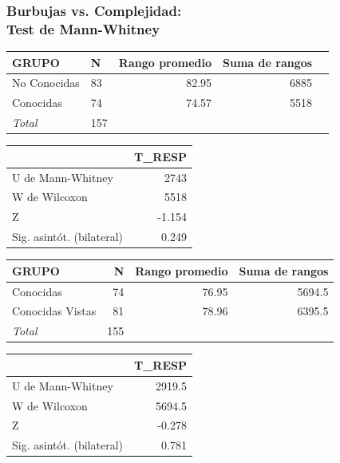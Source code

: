 \documentclass[10pt]{beamer}
\begin{document}
      \begin{frame}
      \tiny
	  \frametitle{Burbujas vs. Complejidad:\\Test de Mann-Whitney}
	\begin{table}
	  \begin{tabular}[t]{|l|l|r|r|r|}
	    \hline
		\textbf{GRUPO} & \textbf{N} & \textbf{Rango promedio} & \textbf{Suma de rangos} \\ \hline
		No Conocidas & 83 & 82.95 & 6885 \\ \hline
		Conocidas & 74 & 74.57 & 5518 \\ \hline
		\textit{Total} & 157 &   &   \\ \hline
	  \end{tabular}   \begin{tabular}[t]{|l|r|}
	    \hline
		& \textbf{T\_RESP} \\ \hline
		  U de Mann-Whitney & 2743 \\ \hline
		  W de Wilcoxon & 5518 \\ \hline
		  Z & -1.154 \\ \hline
		  Sig. asintót. (bilateral) & 0.249 \\ \hline
	  \end{tabular}
	\end{table}

	\begin{table}
	  \begin{tabular}[t]{|l|r|r|r|}
	    \hline
		\textbf{GRUPO} & \textbf{N} & \textbf{Rango promedio} & \textbf{Suma de rangos} \\ \hline
		Conocidas & 74 & 76.95 & 5694.5 \\ \hline
		Conocidas Vistas & 81 & 78.96 & 6395.5 \\ \hline
		\textit{Total} & 155 &   &   \\ \hline
	  \end{tabular}   \begin{tabular}[t]{|l|r|}
	    \hline
		& \textbf{T\_RESP} \\ \hline
		U de Mann-Whitney & 2919.5 \\ \hline
		W de Wilcoxon & 5694.5 \\ \hline
		Z & -0.278 \\ \hline
		Sig. asintót. (bilateral) & 0.781 \\ \hline
	  \end{tabular}
	\end{table}


\end{frame}
\end{document}
